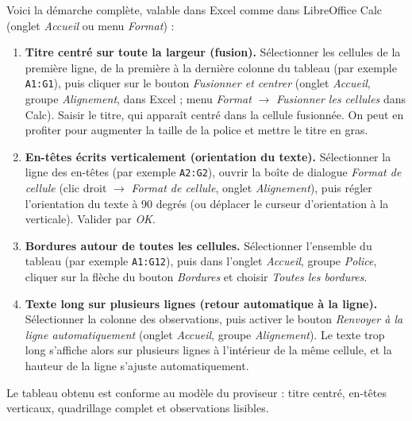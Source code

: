 \documentclass[11pt]{article}
\begin{document}
\begin{corrige}\tcblower
Voici la démarche complète, valable dans Excel comme dans LibreOffice Calc (onglet \emph{Accueil} ou menu \emph{Format}) :
\begin{enumerate}
\item \textbf{Titre centré sur toute la largeur (fusion).} Sélectionner les cellules de la première ligne, de la première à la dernière colonne du tableau (par exemple \texttt{A1:G1}), puis cliquer sur le bouton \emph{Fusionner et centrer} (onglet \emph{Accueil}, groupe \emph{Alignement}, dans Excel ; menu \emph{Format} $\to$ \emph{Fusionner les cellules} dans Calc). Saisir le titre, qui apparaît centré dans la cellule fusionnée. On peut en profiter pour augmenter la taille de la police et mettre le titre en gras.
\item \textbf{En-têtes écrits verticalement (orientation du texte).} Sélectionner la ligne des en-têtes (par exemple \texttt{A2:G2}), ouvrir la boîte de dialogue \emph{Format de cellule} (clic droit $\to$ \emph{Format de cellule}, onglet \emph{Alignement}), puis régler l'orientation du texte à 90 degrés (ou déplacer le curseur d'orientation à la verticale). Valider par \emph{OK}.
\item \textbf{Bordures autour de toutes les cellules.} Sélectionner l'ensemble du tableau (par exemple \texttt{A1:G12}), puis dans l'onglet \emph{Accueil}, groupe \emph{Police}, cliquer sur la flèche du bouton \emph{Bordures} et choisir \emph{Toutes les bordures}.
\item \textbf{Texte long sur plusieurs lignes (retour automatique à la ligne).} Sélectionner la colonne des observations, puis activer le bouton \emph{Renvoyer à la ligne automatiquement} (onglet \emph{Accueil}, groupe \emph{Alignement}). Le texte trop long s'affiche alors sur plusieurs lignes à l'intérieur de la même cellule, et la hauteur de la ligne s'ajuste automatiquement.
\end{enumerate}
Le tableau obtenu est conforme au modèle du proviseur : titre centré, en-têtes verticaux, quadrillage complet et observations lisibles.
\end{corrige}
\end{document}
